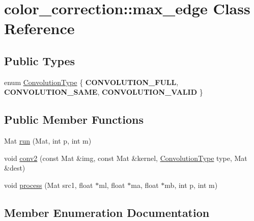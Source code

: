 \hypertarget{classcolor__correction_1_1max__edge}{}\section{color\+\_\+correction\+:\+:max\+\_\+edge Class Reference}
\label{classcolor__correction_1_1max__edge}
\subsection*{Public Types}
\begin{DoxyCompactItemize}
\item 
enum \hyperlink{classcolor__correction_1_1max__edge_af83c7bb6554486a755ba5133a427acc0}{Convolution\+Type} \{ {\bfseries C\+O\+N\+V\+O\+L\+U\+T\+I\+O\+N\+\_\+\+F\+U\+LL}, 
{\bfseries C\+O\+N\+V\+O\+L\+U\+T\+I\+O\+N\+\_\+\+S\+A\+ME}, 
{\bfseries C\+O\+N\+V\+O\+L\+U\+T\+I\+O\+N\+\_\+\+V\+A\+L\+ID}
 \}
\end{DoxyCompactItemize}
\subsection*{Public Member Functions}
\begin{DoxyCompactItemize}
\item 
Mat \hyperlink{classcolor__correction_1_1max__edge_ab986a6eeda0ae54621f48b1a3acde38d}{run} (Mat, int p, int m)
\item 
void \hyperlink{classcolor__correction_1_1max__edge_af9ab5e0868c8e3d667ed63c03f6cf850}{conv2} (const Mat \&img, const Mat \&kernel, \hyperlink{classcolor__correction_1_1max__edge_af83c7bb6554486a755ba5133a427acc0}{Convolution\+Type} type, Mat \&dest)
\item 
void \hyperlink{classcolor__correction_1_1max__edge_a1d72dd0a81e84d809dd2da19342f42a8}{process} (Mat src1, float $\ast$ml, float $\ast$ma, float $\ast$mb, int p, int m)
\end{DoxyCompactItemize}


\subsection{Member Enumeration Documentation}
\mbox{\label{classcolor__correction_1_1max__edge_af83c7bb6554486a755ba5133a427acc0}} 
